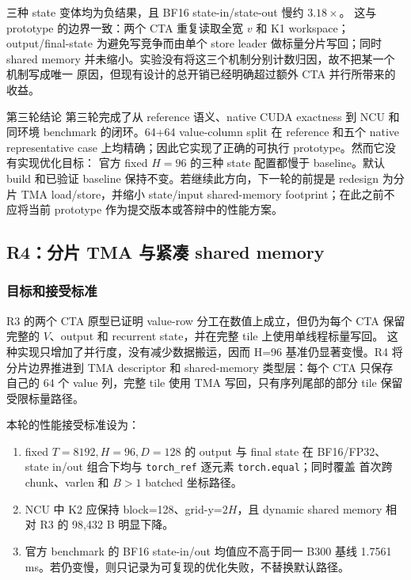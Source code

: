 \documentclass[11pt,a4paper,fontset=none]{ctexart}
\newcommand{\code}[1]{\texttt{#1}}
\begin{document}
三种 state 变体均为负结果，且 BF16 state-in/state-out 慢约 \(3.18\times\)。
这与 prototype 的边界一致：两个 CTA 重复读取全宽 \(v\) 和 K1 workspace；
output/final-state 为避免写竞争而由单个 store leader 做标量分片写回；同时 shared
memory 并未缩小。实验没有将这三个机制分别计数归因，故不把某一个机制写成唯一
原因，但现有设计的总开销已经明确超过额外 CTA 并行所带来的收益。

\begin{record}{第三轮结论}
第三轮完成了从 reference 语义、native CUDA exactness 到 NCU 和同环境 benchmark
的闭环。64+64 value-column split 在 reference 和五个 native representative
case 上均精确；因此它实现了正确的可执行 prototype。然而它没有实现优化目标：
官方 fixed \(H=96\) 的三种 state 配置都慢于 baseline。默认 build 和已验证
baseline 保持不变。若继续此方向，下一轮的前提是 redesign 为分片 TMA
load/store，并缩小 state/input shared-memory footprint；在此之前不应将当前
prototype 作为提交版本或答辩中的性能方案。
\end{record}

\subsection{R4：分片 TMA 与紧凑 shared memory}

\subsubsection{目标和接受标准}

R3 的两个 CTA 原型已证明 value-row 分工在数值上成立，但仍为每个 CTA 保留
完整的 \(V\)、output 和 recurrent state，并在完整 tile 上使用单线程标量写回。
这种实现只增加了并行度，没有减少数据搬运，因而 H=96 基准仍显著变慢。R4 将
分片边界推进到 TMA descriptor 和 shared-memory 类型层：每个 CTA 只保存
自己的 64 个 value 列，完整 tile 使用 TMA 写回，只有序列尾部的部分 tile 保留
受限标量路径。

本轮的性能接受标准设为：

\begin{enumerate}
\item fixed \(T=8192,H=96,D=128\) 的 output 与 final state 在 BF16/FP32、state
      in/out 组合下均与 \code{torch\_ref} 逐元素 \code{torch.equal}；同时覆盖
      首次跨 chunk、varlen 和 \(B>1\) batched 坐标路径。
\item NCU 中 K2 应保持 block=128、grid-y=\(2H\)，且 dynamic shared memory
      相对 R3 的 98,432 B 明显下降。
\item 官方 benchmark 的 BF16 state-in/out 均值应不高于同一 B300 基线
      1.7561 ms。若仍变慢，则只记录为可复现的优化失败，不替换默认路径。
\end{enumerate}
\end{document}
